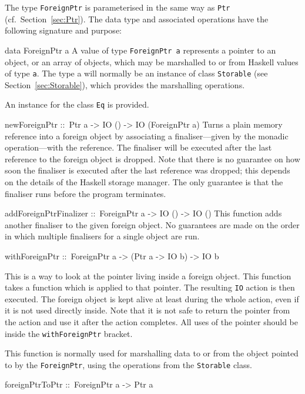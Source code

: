 \documentclass[a4paper,twosides]{article}
\makeatletter
\newcommand{\code}[1]{\texttt{#1}}      %
\newenvironment{codedesc}{%
  \list{}{\labelwidth\z@
    \let\makelabel\codedesclabel}
  }{%
  \endlist
  }
\newcommand*{\codedesclabel}[1]{%
  \hspace{-\leftmargin}
  \parbox[b]{\labelwidth}{\makebox[0pt][l]{\code{#1}}\\}\hfil\relax
  }
\makeatother
\begin{document}
The type \code{ForeignPtr} is parameterised in the same way as \code{Ptr}
(cf.\ Section~\ref{sec:Ptr}).  The data type and associated operations have
the following signature and purpose:
%
\begin{codedesc}
\item[data ForeignPtr a] A value of type \code{ForeignPtr a} represents a
  pointer to an object, or an array of objects, which may be marshalled to or
  from Haskell values of type \code{a}.  The type a will normally be an
  instance of class \code{Storable} (see Section~\ref{sec:Storable}), which
  provides the marshalling operations.
  
  An instance for the class \code{Eq} is provided.
  
\item[newForeignPtr ::\ Ptr a -> IO () -> IO (ForeignPtr a)] Turns a plain
  memory reference into a foreign object by associating a finaliser---given by
  the monadic operation---with the reference. The finaliser will be executed
  after the last reference to the foreign object is dropped. Note that there
  is no guarantee on how soon the finaliser is executed after the last
  reference was dropped; this depends on the details of the Haskell storage
  manager. The only guarantee is that the finaliser runs before the program
  terminates.  
  
\item[addForeignPtrFinalizer ::\ ForeignPtr a -> IO () -> IO ()] This function
  adds another finaliser to the given foreign object. No guarantees are made
  on the order in which multiple finalisers for a single object are run.

\item[withForeignPtr ::\ ForeignPtr a -> (Ptr a -> IO b) -> IO b]
  
  This is a way to look at the pointer living inside a foreign object. This
  function takes a function which is applied to that pointer. The resulting
  \code{IO} action is then executed. The foreign object is kept alive at least
  during the whole action, even if it is not used directly inside. Note that
  it is not safe to return the pointer from the action and use it after the
  action completes. All uses of the pointer should be inside the
  \code{withForeignPtr} bracket.
  
  This function is normally used for marshalling data to or from the object
  pointed to by the \code{ForeignPtr}, using the operations from the
  \code{Storable} class.

\item[foreignPtrToPtr ::\ ForeignPtr a -> Ptr a]
  

\end{codedesc}
\end{document}

